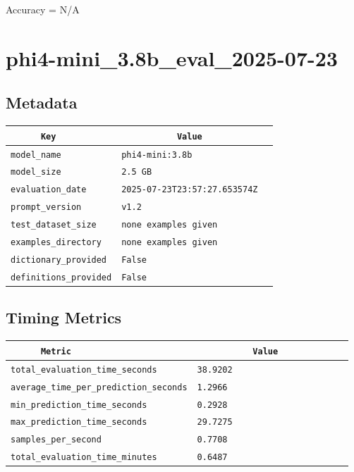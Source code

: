 \documentclass{article}
\begin{document}
\begin{center}
Accuracy = N/A
\end{center}

\section{phi4-mini\_3.8b\_eval\_2025-07-23}
\subsection{Metadata}

\begin{center}
\begin{tabular}{l | l} \hline
    \verb|      Key      | & \verb|           Value           | \\ \hline
    \hline
    \verb|model_name    | & \verb|phi4-mini:3.8b               | \\ \hline
    \verb|model_size    | & \verb|2.5 GB                       | \\ \hline
    \verb|evaluation_date| & \verb|2025-07-23T23:57:27.653574Z  | \\ \hline
    \verb|prompt_version| & \verb|v1.2                         | \\ \hline
    \verb|test_dataset_size| & \verb|none examples given          | \\ \hline
    \verb|examples_directory| & \verb|none examples given          | \\ \hline
    \verb|dictionary_provided| & \verb|False                        | \\ \hline
    \verb|definitions_provided| & \verb|False                        | \\ \hline
\end{tabular}
\end{center}

\subsection{Timing Metrics}

\begin{center}
\begin{tabular}{l | l} \hline
    \verb|      Metric     | & \verb|           Value           | \\ \hline
    \hline
    \verb|total_evaluation_time_seconds| & \verb|38.9202                      | \\ \hline
    \verb|average_time_per_prediction_seconds| & \verb|1.2966                       | \\ \hline
    \verb|min_prediction_time_seconds| & \verb|0.2928                       | \\ \hline
    \verb|max_prediction_time_seconds| & \verb|29.7275                      | \\ \hline
    \verb|samples_per_second| & \verb|0.7708                       | \\ \hline
    \verb|total_evaluation_time_minutes| & \verb|0.6487                       | \\ \hline
\end{tabular}
\end{center}
\end{document}
